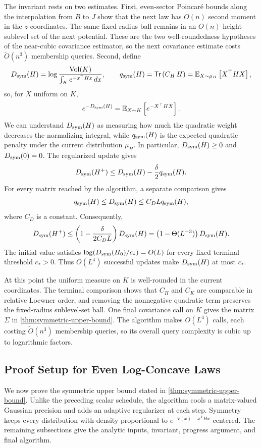 \documentclass[11pt]{article}
\numberwithin{equation}{section}
\theoremstyle{definition}
\newcommand{\Vol}{\mathrm{Vol}}
\newcommand{\E}[2]{\mathbb{E}_{#1}\left[#2\right]}
\newcommand{\Tr}[1]{\mathsf{Tr}\left(#1\right)}
\begin{document}
The invariant rests on two estimates.
First, even-sector Poincar\'e bounds along the interpolation from $B$ to
$J$ show that the next law has
$O(n)$ second moment in the
$z$-coordinates.
The same fixed-radius ball remains in an $O(n)$-height sublevel set of the next
potential.
These are the two well-roundedness hypotheses of the near-cubic covariance
estimator, so the next covariance estimate costs $\widetilde O(n^3)$ membership
queries.
Second, define
\[
D_{\rm sym}(H)=\log\frac{\Vol(K)}{\int_K e^{-x^\top Hx}\,dx},
\qquad
q_{\rm sym}(H)
=\Tr{C_H\,H}
=\E{X\sim\mu_H}{X^\top HX},
\]
so, for $X$ uniform on
$K$,
\[
 e^{-D_{\rm sym}(H)}=\E{X\sim K}{e^{-X^\top H X}}.
\]
We can understand $D_{\rm sym}(H)$ as measuring how much the quadratic weight
decreases the normalizing integral, while
$q_{\rm sym}(H)$ is the expected quadratic penalty under the current
distribution
$\mu_H$.
In particular, $D_{\rm sym}(H)\geq0$ and
$D_{\rm sym}(0)=0$.
The regularized update gives
\[
D_{\rm sym}(H^+)\leq D_{\rm sym}(H)
-\frac{\delta}{2}q_{\rm sym}(H).
\]
For every matrix reached by the algorithm, a separate comparison gives
\[
q_{\rm sym}(H)
\leq D_{\rm sym}(H)
\leq C_DLq_{\rm sym}(H),
\]
where $C_D$ is a constant.
Consequently,
\[
D_{\rm sym}(H^+)
\leq\left(1-\frac{\delta}{2C_DL}\right)D_{\rm sym}(H)
=\left(1-\Theta(L^{-3})\right)D_{\rm sym}(H).
\]
The initial value satisfies $\log(D_{\rm sym}(H_0)/c_*)=O(L)$ for every fixed
terminal threshold
$c_*>0$.
Thus $O(L^4)$ successful updates make
$D_{\rm sym}(H)$ at most
$c_*$.

At this point the uniform measure on $K$ is well-rounded in the current
coordinates.
The terminal comparison shows that $C_H$ and
$C_K$ are comparable in relative Loewner order, and removing the nonnegative
quadratic term preserves the fixed-radius sublevel-set ball.
One final covariance call on $K$ gives the matrix
$\Sigma$ in \cref{thm:symmetric-upper-bound}.
The algorithm makes $O(L^4)$ calls, each costing
$\widetilde O(n^3)$ membership queries, so its overall query complexity is cubic
up to logarithmic factors.

\subsection{Proof Setup for Even Log-Concave Laws}
\label{sec:symmetric-proof-setup}

We now prove the symmetric upper bound stated in
\cref{thm:symmetric-upper-bound}.
Unlike the preceding scalar schedule, the algorithm cools a matrix-valued
Gaussian precision and adds an adaptive regularizer at each step.
Symmetry keeps every distribution with density proportional to
$e^{-V(x)-x^{\mathsf T}Hx}$ centered.
The remaining subsections give the analytic inputs, invariant, progress
argument, and final algorithm.
\end{document}
